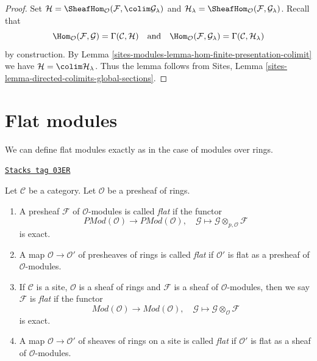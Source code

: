 \begin{proof}
Set $\mathcal{H} =
\SheafHom_\mathcal{O}(\mathcal{F}, \colim \mathcal{G}_\lambda)$
and $\mathcal{H}_\lambda =
\SheafHom_\mathcal{O}(\mathcal{F}, \mathcal{G}_\lambda)$.
Recall that
$$
\Hom_\mathcal{O}(\mathcal{F}, \mathcal{G}) = \Gamma(\mathcal{C}, \mathcal{H})
\quad\text{and}\quad
\Hom_\mathcal{O}(\mathcal{F}, \mathcal{G}_\lambda) =
\Gamma(\mathcal{C}, \mathcal{H}_\lambda)
$$
by construction. By Lemma \ref{sites-modules-lemma-hom-finite-presentation-colimit} we have
$\mathcal{H} = \colim \mathcal{H}_\lambda$. Thus the lemma follows from
Sites, Lemma \ref{sites-lemma-directed-colimits-global-sections}.
\end{proof}

\section{Flat modules}
\label{sites-modules-section-flat}
We can define flat modules exactly as in the case of modules over rings.

\begin{definition}[Flat]
\label{sites-modules-definition-flat}
\href{https://stacks.math.columbia.edu/tag/03ER}{\texttt{Stacks tag 03ER}}

Let $\mathcal{C}$ be a category.
Let $\mathcal{O}$ be a presheaf of rings.
\begin{enumerate}
\item A presheaf $\mathcal{F}$ of $\mathcal{O}$-modules is called
{\it flat} if the functor
$$
\textit{PMod}(\mathcal{O})
\longrightarrow
\textit{PMod}(\mathcal{O}), \quad
\mathcal{G} \mapsto \mathcal{G} \otimes_{p, \mathcal{O}} \mathcal{F}
$$
is exact.
\item A map $\mathcal{O} \to \mathcal{O}'$ of presheaves of rings
is called {\it flat} if $\mathcal{O}'$ is flat as a presheaf of
$\mathcal{O}$-modules.
\item If $\mathcal{C}$ is a site, $\mathcal{O}$ is a sheaf of rings
and $\mathcal{F}$ is a sheaf of $\mathcal{O}$-modules, then we
say $\mathcal{F}$ is {\it flat} if the functor
$$
\textit{Mod}(\mathcal{O})
\longrightarrow
\textit{Mod}(\mathcal{O}), \quad
\mathcal{G} \mapsto \mathcal{G} \otimes_\mathcal{O} \mathcal{F}
$$
is exact.
\item A map $\mathcal{O} \to \mathcal{O}'$ of sheaves of rings on a site
is called {\it flat} if $\mathcal{O}'$ is flat as a sheaf of
$\mathcal{O}$-modules.
\end{enumerate}
\end{definition}

